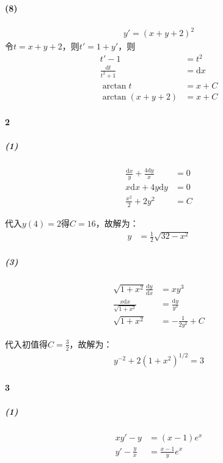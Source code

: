 \documentclass[UTF8]{ctexart}
\begin{document}
    \paragraph*{(8)}
    \begin{align*}
        y' = (x+y+2)^2
    \end{align*}
    令$t=x+y+2$，则$t'=1+y'$，则
    \begin{align*}
        t'-1 &= t^2\\
        \frac{\mathrm{d}t}{t^2+1} &= \mathrm{d}x \\ 
        \arctan t &= x + C \\
        \arctan (x+y+2) &= x+C
    \end{align*}
    \paragraph*{2}
    \subparagraph*{(1)}
    \begin{align*}
        \frac{\mathrm{d}x}{y} + \frac{4 \mathrm{d}y}{x} &= 0 \\
        x \mathrm{d}x + 4y \mathrm{d}y &= 0\\
        \frac{x^2}{2} + 2 y^2 &= C
    \end{align*}

    代入$y(4)=2$得$C=16$，故解为：
    \begin{align*}
        y &= \frac{1}{2} \sqrt{32-x^2} 
    \end{align*}
    \subparagraph*{(3)}
    \begin{align*}
        \sqrt{1+x^2} \frac{\mathrm{d}y}{\mathrm{d}x} &= xy^3 \\
        \frac{x \mathrm{d}x}{\sqrt{1+x^2} } &= \frac{\mathrm{d}y}{y^3} \\ 
        \sqrt{1+x^2}  &= -\frac{1}{2y^2} + C
    \end{align*}

    代入初值得$C=\frac{3}{2}$，故解为：
    \begin{align*}
        y^{-2}+2(1+x^2)^{1/2} = 3
    \end{align*}

    \paragraph*{3}
    \subparagraph*{(1)}
    \begin{align*}
        xy' - y &= (x-1)e^x \\
        y' - \frac{y}{x} &= \frac{x-1}{y} e^x
    \end{align*}
\end{document}
